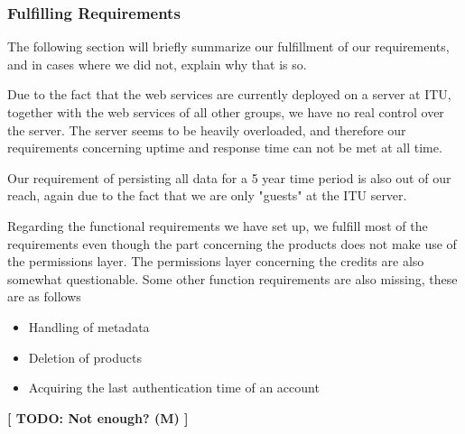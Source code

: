 \subsubsection{Fulfilling Requirements}
\label{serverfulfil}
The following section will briefly summarize our fulfillment of our requirements, and in cases where we did not, explain why that is so.

Due to the fact that the web services are currently deployed on a server at ITU, together with the web services of all other groups, we have no real control over the server. The server seems to be heavily overloaded, and therefore our requirements concerning uptime and response time can not be met at all time.

Our requirement of persisting all data for a 5 year time period is also out of our reach, again due to the fact that we are only "guests" at the ITU server.

Regarding the functional requirements we have set up, we fulfill most of the requirements even though the part concerning the products does not make use of the permissions layer. The permissions layer concerning the credits are also somewhat questionable. 
Some other function requirements are also missing, these are as follows
\begin{itemize}
\item Handling of metadata
\item Deletion of products
\item Acquiring the last authentication time of an account
\end{itemize}

\textbf{[ TODO: Not enough? (M) ]}